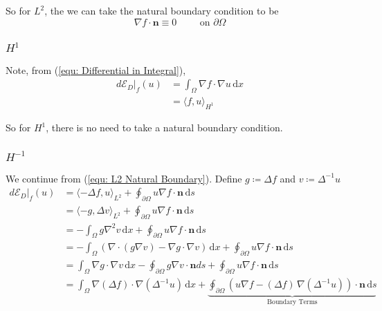 \documentclass[a4paper]{article}
\newcommand{\dx}{\, \text{d} x}
\newcommand{\ds}{\, \text{d} s}
\theoremstyle{definition}
\begin{document}
So for $L^2$, the we can take the natural boundary condition to be
\begin{equation*}
    \nabla f \cdot \mathbf{n} \equiv 0 \hspace{1cm} \text{on } \partial \Omega
\end{equation*}

\subsubsection{$H^1$}
Note, from (\ref{equ: Differential in Integral}),
\begin{align}
    d \mathcal{E}_D|_f(u) &= \int_{\Omega} \nabla f \cdot \nabla u \dx \\
    &= \langle f, u \rangle_{H^1}
\end{align}

So for $H^1$, there is no need to take a natural boundary condition.
\subsubsection{$H^{-1}$}
We continue from (\ref{equ: L2 Natural Boundary}).
Define $g \coloneqq \Delta f$ and $v \coloneqq \Delta^{-1} u$
\begin{align}
    d \mathcal{E}_D|_f(u) &= \langle -\Delta f, u \rangle_{L^2} + \oint_{\partial \Omega} u \nabla f \cdot \mathbf{n} \ds \\
    &= \langle -g, \Delta v \rangle_{L^2} + \oint_{\partial \Omega} u \nabla f \cdot \mathbf{n} \ds \\
    &= -\int_{\Omega} g \nabla^2 v \dx + \oint_{\partial \Omega} u \nabla f \cdot \mathbf{n} \ds \\
    &= -\int_{\Omega} \left( \nabla \cdot \left( g \nabla v \right) - \nabla g \cdot \nabla v \right)  \dx + \oint_{\partial \Omega} u \nabla f \cdot \mathbf{n} \ds \\
    &= \int_{\Omega} \nabla g \cdot \nabla v \dx -\oint_{\partial \Omega} g \nabla v \cdot \mathbf{n} ds + \oint_{\partial \Omega} u \nabla f \cdot \mathbf{n} \ds \\
    &= \int_{\Omega} \nabla \left( \Delta f \right) \cdot \nabla \left( \Delta^{-1} u \right) \dx 
    + \underbrace{\oint_{\partial \Omega} \left( u \nabla f - (\Delta f) \, \nabla \left( \Delta^{-1} u \right) \right) \cdot \mathbf{n} \ds}_{\text{Boundary Terms}}
\end{align}
\end{document}
